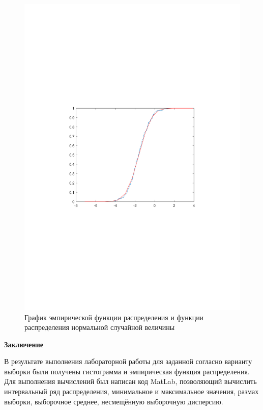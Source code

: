 \documentclass[12pt,a4paper]{scrartcl}
\begin{document}
\begin{figure}
	\centering
	\includegraphics[width=1\linewidth]{1}
	\caption{График эмпирической функции распределения и функции распределения нормальной случайной величины}
	\label{graph2.1}
\end{figure}

\newpage
{}
\begin{center}
\textbf {Заключение}
\end{center}
В результате выполнения лабораторной работы для заданной согласно варианту выборки были получены гистограмма и эмпирическая функция распределения. Для выполнения вычислений был написан код MatLab, позволяющий вычислить интервальный ряд распределения, минимальное и максимальное значения, размах выборки, выборочное среднее, несмещённую выборочную дисперсию.
\end{document}
